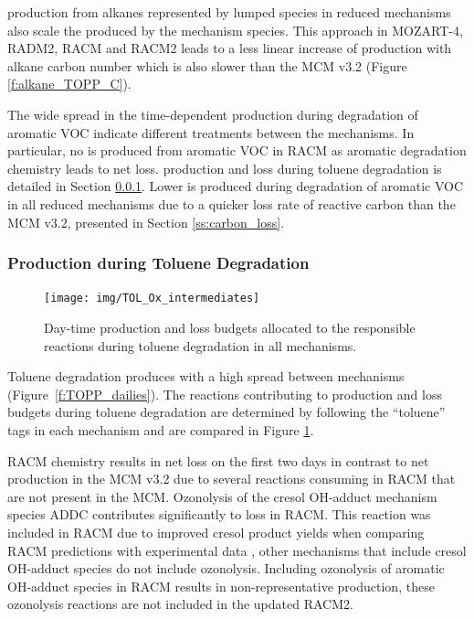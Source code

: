  production from alkanes represented by lumped species in reduced mechanisms also scale the  produced by the mechanism species.
This approach in MOZART-4, RADM2, RACM and RACM2 leads to a less linear increase of  production with alkane carbon number which is also slower than the MCM v3.2 (Figure \ref{f:alkane_TOPP_C}).

The wide spread in the time-dependent  production during degradation of aromatic VOC indicate different treatments between the mechanisms.
In particular, no  is produced from aromatic VOC in RACM as aromatic degradation chemistry leads to net  loss.
 production and loss during toluene degradation is detailed in Section \ref{sss:aromatic}.
Lower  is produced during degradation of aromatic VOC in all reduced mechanisms due to a quicker loss rate of reactive carbon than the MCM v3.2, presented in Section \ref{ss:carbon_loss}.

\subsubsection[Ox Production during Toluene Degradation]{ Production during Toluene Degradation} \label{sss:aromatic}

\begin{figure}
    \centering
    \texttt{[image: img/TOL\_Ox\_intermediates]}
    \vspace{0mm}
    \caption{Day-time  production and loss budgets allocated to the responsible reactions during toluene degradation in all mechanisms.}
    \vspace{-4mm}
    \label{f:toluene_Ox}
\end{figure}

Toluene degradation produces  with a high spread between mechanisms (\mbox{Figure \ref{f:TOPP_dailies}}).
The reactions contributing to  production and loss budgets during toluene degradation are determined by following the ``toluene'' tags in each mechanism and are compared in Figure \ref{f:toluene_Ox}.

RACM chemistry results in net  loss on the first two days in contrast to net  production in the MCM v3.2 due to several reactions consuming  in RACM that are not present in the MCM.
Ozonolysis of the cresol OH-adduct mechanism species ADDC contributes significantly to  loss in RACM.
This reaction was included in RACM due to improved cresol product yields when comparing RACM predictions with experimental data \citep{Stockwell:1997}, other mechanisms that include cresol OH-adduct species do not include ozonolysis.
Including ozonolysis of aromatic OH-adduct species in RACM results in non-representative  production, these ozonolysis reactions are not included in the updated RACM2.

